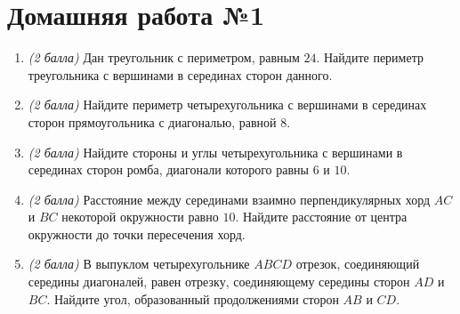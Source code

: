\documentclass[12pt, a4paper]{article}
\begin{document}
	
	\section*{Домашняя работа №1}
	\begin{enumerate}
		\item \textit{(2 балла)} Дан треугольник с периметром, равным $24$. Найдите периметр треугольника с вершинами в серединах сторон данного.
		\item \textit{(2 балла)} Найдите периметр четырехугольника с вершинами в серединах сторон прямоугольника с диагональю, равной $8$.
		\item \textit{(2 балла)} Найдите стороны и углы четырехугольника с вершинами в серединах сторон ромба, диагонали которого равны $6$ и $10$.
		\item \textit{(2 балла)} Расстояние между серединами взаимно перпендикулярных хорд $AC$ и $BC$ некоторой окружности равно $10$. Найдите расстояние от центра окружности до точки пересечения хорд.
		\item \textit{(2 балла)} В выпуклом четырехугольнике $ABCD$ отрезок, соединяющий середины диагоналей, равен отрезку, соединяющему середины сторон $AD$ и $BC$. Найдите угол, образованный продолжениями сторон $AB$ и $CD$.
	\end{enumerate}
\end{document}
